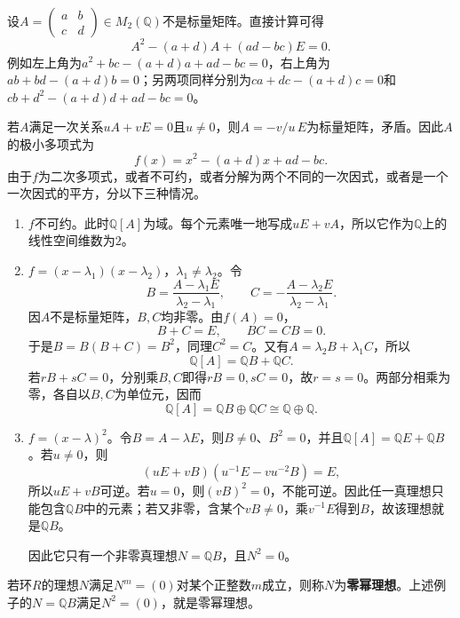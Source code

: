 \begin{example}
设$A=\begin{pmatrix}a&b\\c&d\end{pmatrix}\in M_2(\mathbb Q)$不是标量矩阵。直接计算可得
\[
A^2-(a+d)A+(ad-bc)E=0.
\]
例如左上角为$a^2+bc-(a+d)a+ad-bc=0$，右上角为$ab+bd-(a+d)b=0$；另两项同样分别为$ca+dc-(a+d)c=0$和$cb+d^2-(a+d)d+ad-bc=0$。

若$A$满足一次关系$uA+vE=0$且$u\ne0$，则$A=-v/u\,E$为标量矩阵，矛盾。因此$A$的极小多项式为
\[
f(x)=x^2-(a+d)x+ad-bc.
\]
由于$f$为二次多项式，或者不可约，或者分解为两个不同的一次因式，或者是一个一次因式的平方，分以下三种情况。
\begin{enumerate}

\item $f$不可约。此时$\mathbb Q[A]$为域。每个元素唯一地写成$uE+vA$，所以它作为$\mathbb Q$上的线性空间维数为$2$。

\item $f=(x-\lambda_1)(x-\lambda_2)$，$\lambda_1\ne\lambda_2$。令
\[
B=\frac{A-\lambda_1E}{\lambda_2-\lambda_1},\qquad
C=-\frac{A-\lambda_2E}{\lambda_2-\lambda_1}.
\]
因$A$不是标量矩阵，$B,C$均非零。由$f(A)=0$，
\[
B+C=E,\qquad BC=CB=0.
\]
于是$B=B(B+C)=B^2$，同理$C^2=C$。又有$A=\lambda_2B+\lambda_1C$，所以
\[
\mathbb Q[A]=\mathbb QB+\mathbb QC.
\]
若$rB+sC=0$，分别乘$B,C$即得$rB=0,sC=0$，故$r=s=0$。两部分相乘为零，各自以$B,C$为单位元，因而
\[
\mathbb Q[A]=\mathbb QB\oplus\mathbb QC\cong\mathbb Q\oplus\mathbb Q.
\]

\item $f=(x-\lambda)^2$。令$B=A-\lambda E$，则$B\ne0$、$B^2=0$，并且$\mathbb Q[A]=\mathbb QE+\mathbb QB$。若$u\ne0$，则
\[
(uE+vB)\left(u^{-1}E-vu^{-2}B\right)=E,
\]
所以$uE+vB$可逆。若$u=0$，则$(vB)^2=0$，不能可逆。因此任一真理想只能包含$\mathbb QB$中的元素；若又非零，含某个$vB\ne0$，乘$v^{-1}E$得到$B$，故该理想就是$\mathbb QB$。

因此它只有一个非零真理想$N=\mathbb QB$，且$N^2=0$。
\end{enumerate}
\end{example}

\begin{definition}
若环$R$的理想$N$满足$N^m=(0)$对某个正整数$m$成立，则称$N$为\textbf{零幂理想}。上述例子的$N=\mathbb QB$满足$N^2=(0)$，就是零幂理想。
\end{definition}


